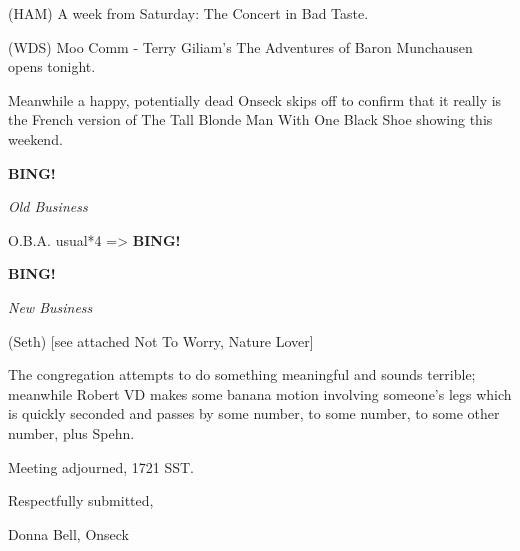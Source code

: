 \documentclass[12pt]{article}
\newcommand{\bing}{{\bf BING!} }
\newcommand{\goto}[1]{\bing \vskip 12pt \centerline{{\em{#1}}}}
\begin{document}
(HAM) A week from Saturday: The Concert in Bad Taste.

(WDS) Moo Comm - Terry Giliam's The Adventures of Baron Munchausen opens tonight.

Meanwhile a happy, potentially dead Onseck skips off to confirm that it really is the French version of The Tall Blonde Man With One Black Shoe showing this weekend.

\goto{Old Business}

O.B.A. usual*4 => \bing

\goto{New Business}

(Seth) [see attached Not To Worry, Nature Lover]

The congregation attempts to do something meaningful and sounds terrible; meanwhile Robert VD makes some banana motion involving someone's legs which is quickly seconded and passes by some number, to some number, to some other number, plus Spehn.

\vspace{12pt}

\noindent
Meeting adjourned, 1721 SST.

\vspace{18pt}

\centerline{Respectfully submitted,}
\centerline{Donna Bell, Onseck}
\end{document}
